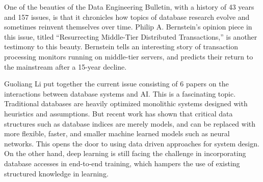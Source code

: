\documentclass[11pt]{article}
\begin{document}
One of the beauties of the Data Engineering Bulletin, with a history
of 43 years and 157 issues, is that it chronicles how topics of
database research evolve and sometimes reinvent themselves over
time. Philip A. Bernstein's opinion piece in this issue, titled
``Resurrecting Middle-Tier Distributed Transactions,'' is another
testimony to this beauty. Bernstein tells an interesting story of
transaction processing monitors running on middle-tier servers, and
predicts their return to the mainstream after a 15-year decline.

Guoliang Li put together the current issue consisting of 6 papers on
the interactions between database systems and AI. This is a
fascinating topic. Traditional databases are heavily optimized
monolithic systems designed with heuristics and assumptions. But
recent work has shown that critical data structures such as database
indices are merely models, and can be replaced with more flexible,
faster, and smaller machine learned models such as neural
networks. This opens the door to using data driven approaches for
system design. On the other hand, deep learning is still facing the
challenge in incorporating database accesses in end-to-end training,
which hampers the use of existing structured knowledge in learning.
\end{document}
